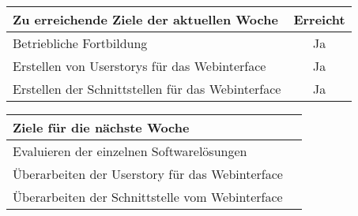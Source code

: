 \begin{tabularx}{\textwidth}{Xc}
    \arrayrulecolor{OliveGreen}
    \toprule
    {\bfseries Zu erreichende Ziele der aktuellen Woche} & {\bfseries Erreicht} \\
    \midrule[2pt]
    Betriebliche Fortbildung                                &Ja              \\
    \rowcolor{OliveGreen!15}
    Erstellen von Userstorys für das Webinterface          &Ja               \\
    \rowcolor{White}
    Erstellen der Schnittstellen für das Webinterface      &Ja               \\
    \bottomrule[2pt]
\end{tabularx}
%
\vspace{1cm}
%
\begin{tabularx}{\textwidth}{Xc}
    \arrayrulecolor{OliveGreen}
    \toprule
    {\bfseries Ziele für die nächste Woche}        &                         \\
    \midrule[2pt]
    Evaluieren der einzelnen Softwarelösungen      &                         \\
    \rowcolor{OliveGreen!15}
    Überarbeiten der Userstory für das Webinterface&                         \\
    \rowcolor{White}
    Überarbeiten der Schnittstelle vom Webinterface&                         \\
\end{tabularx}
